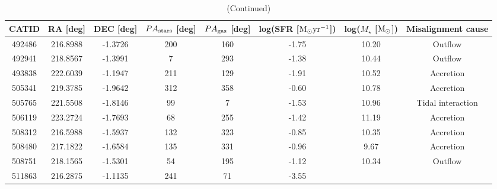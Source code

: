 \documentclass[fleqn,usenatbib]{mnras}
\begin{document}
\setlength{\tabcolsep}{9.0pt} %
\renewcommand{\arraystretch}{1.2}
\begin{table}
\centering
\caption{(Continued)}\label{tab:TableA4}

\begin{tabular*}{\linewidth}{cccccccc}
\hline
\multicolumn{1}{l}{CATID} & \multicolumn{1}{l}{RA [deg]} & \multicolumn{1}{l}{DEC [deg]} & \multicolumn{1}{l}{$PA_{\rm{stars}}$ [deg]} & \multicolumn{1}{l}{$PA_{\rm{gas}}$ [deg]} & \multicolumn{1}{l}{log(SFR [$\rm{M_{\odot}yr^{-1}}$])} & \multicolumn{1}{l}{log($M_{\star}$ [$\rm{M_{\odot}}$])} & \multicolumn{1}{l}{Misalignment cause} \\
\hline

492486                    & 216.8988 & -1.3726  & 200                           & 160                         & -1.75%
& 10.20%
& Outflow            \\
492941                    & 218.8567 & -1.3991  & 7                             & 293                         & -1.38%
& 10.44%
& Outflow            \\
493838                    & 222.6039 & -1.1947  & 211                           & 129                         & -1.91%
& 10.52%
& Accretion          \\
505341                    & 219.3785 & -1.9642  & 312                           & 358                         & -0.60%
& 10.78%
& Accretion          \\
505765                    & 221.5508 & -1.8146  & 99                            & 7                           & -1.53%
& 10.96%
& Tidal interaction  \\
506119                    & 223.2724 & -1.7693  & 68                            & 255                         & -1.42%
& 11.19%
& Accretion          \\
508312                    & 216.5988 & -1.5937  & 132                           & 323                         & -0.85%
& 10.35%
& Accretion          \\
508480                    & 217.1822 & -1.6584  & 135                           & 331                         & -0.96%
& 9.67%
& Accretion          \\
508751                    & 218.1565 & -1.5301  & 54                            & 195                         & -1.12%
& 10.34%
& Outflow            \\
511863                    & 216.2875 & -1.1135  & 241                           & 71                          & -3.55%

\end{tabular*}
\end{table}
\end{document}
